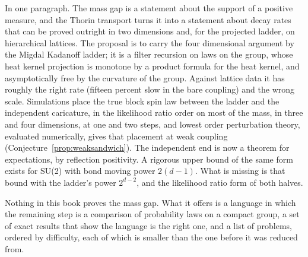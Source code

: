 In one paragraph. The mass gap is a statement about the support of a positive measure, and the Thorin transport turns it into a statement about decay rates that can be proved outright in two dimensions and, for the projected ladder, on hierarchical lattices. The proposal is to carry the four dimensional argument by the Migdal Kadanoff ladder; it is a filter recursion on laws on the group, whose heat kernel projection is monotone by a product formula for the heat kernel, and asymptotically free by the curvature of the group. Against lattice data it has roughly the right rate (fifteen percent slow in the bare coupling) and the wrong scale. Simulations place the true block spin law between the ladder and the independent caricature, in the likelihood ratio order on most of the mass, in three and four dimensions, at one and two steps, and lowest order perturbation theory, evaluated numerically, gives that placement at weak coupling (Conjecture~\ref{prop:weaksandwich}). The independent end is now a theorem for expectations, by reflection positivity. A rigorous upper bound of the same form exists for SU(2) with bond moving power $2(d-1)$. What is missing is that bound with the ladder's power $2^{d-2}$, and the likelihood ratio form of both halves.

Nothing in this book proves the mass gap. What it offers is a language in which the remaining step is a comparison of probability laws on a compact group, a set of exact results that show the language is the right one, and a list of problems, ordered by difficulty, each of which is smaller than the one before it was reduced from.
